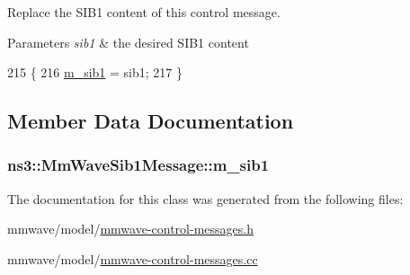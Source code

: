 Replace the S\+I\+B1 content of this control message. 


\begin{DoxyParams}{Parameters}
{\em sib1} & the desired S\+I\+B1 content \\
\hline
\end{DoxyParams}

\begin{DoxyCode}
215 \{
216   \hyperlink{classns3_1_1MmWaveSib1Message_a47ee2a68afc4837f542b70da4c6b484c}{m\_sib1} = sib1;
217 \}
\end{DoxyCode}


\subsection{Member Data Documentation}
\subsubsection[{\texorpdfstring{m\+\_\+sib1}{m_sib1}}]{ ns3\+::\+Mm\+Wave\+Sib1\+Message\+::m\+\_\+sib1\hspace{0.3cm}{\ttfamily [private]}}\hypertarget{classns3_1_1MmWaveSib1Message_a47ee2a68afc4837f542b70da4c6b484c}{}\label{classns3_1_1MmWaveSib1Message_a47ee2a68afc4837f542b70da4c6b484c}


The documentation for this class was generated from the following files\+:\begin{DoxyCompactItemize}
\item 
mmwave/model/\hyperlink{mmwave-control-messages_8h}{mmwave-\/control-\/messages.\+h}\item 
mmwave/model/\hyperlink{mmwave-control-messages_8cc}{mmwave-\/control-\/messages.\+cc}\end{DoxyCompactItemize}
